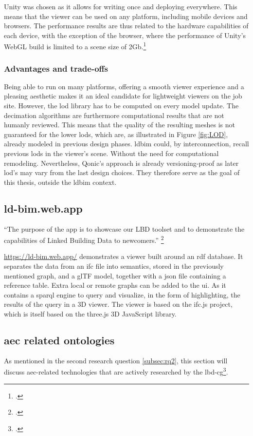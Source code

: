 Unity was chosen as it allows for writing once and deploying everywhere. This means that the viewer can be used on any platform, including mobile devices and browsers. The performance results are thus related to the hardware capabilities of each device, with the exception of the browser, where the performance of Unity's WebGL build is limited to a scene size of 2Gb.\footcite{UnityWebGL}

\subsubsection{Advantages and trade-offs}
Being able to run on many platforms, offering a smooth viewer experience and a pleasing aesthetic makes it an ideal candidate for lightweight viewers on the job site. However, the \ac{lod} library has to be computed on every model update. The decimation algorithms are furthermore computational results that are not humanly reviewed. This means that the quality of the resulting meshes is not guaranteed for the lower \ac{lod}s, which are, as illustrated in Figure \ref{fig:LOD}, already modeled in previous design phases. \ac{ldbim} could, by interconnection, recall previous \ac{lod}s in the viewer's scene. Without the need for computational remodeling. Nevertheless, Qonic's approach is already versioning-proof as later \ac{lod}'s may vary from the last design choices. They therefore serve as the goal of this thesis, outside the \ac{ldbim} context.

\subsection{ld-bim.web.app}
\enquote{The purpose of the app is to showcase our LBD toolset and to demonstrate the capabilities of Linked Building Data to newcomers.} \footcite{lbdimApp}

\url{https://ld-bim.web.app/} demonstrates a viewer built around an \ac{rdf} database. It separates the data from an \ac{ifc} file into semantics, stored in the previously mentioned graph, and a glTF model, together with a \ac{json} file containing a reference table. Extra local or remote graphs can be added to the \ac{ui}. As it contains a \ac{sparql} engine to query and visualize, in the form of highlighting, the results of the query in a 3D viewer. The viewer is based on the ifc.js project, which is itself based on the three.js 3D JavaScript library.

\subsection{\acs{aec} related ontologies}
As mentioned in the second research question \ref{subsec:rq2}, this section will discuss \ac{aec}-related technologies that are actively researched by the \ac{lbd-cg}\footcite{lbdOntologies}.

